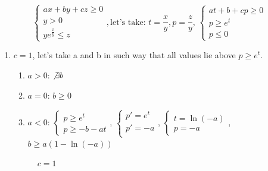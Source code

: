 \begin{equation*}
\begin{cases}
    a x + b y + c z \geq 0 \\
    y > 0 \\
    y e^{\frac{x}{y}} \leq z
\end{cases}, \text{let's take: $t = \frac{x}{y}, p = \frac{z}{y}$, }
\begin{cases}
    at + b + cp \geq 0 \\
    p \geq e^t \\
    p \leq 0
\end{cases}
\end{equation*}
\begin{enumerate}
    \item $c = 1$, let's take a and b in such way that all values lie above $p \geq e^t$.
    \begin{enumerate}
        \item $a > 0$: $\not \exists b$
        \item $a = 0$: $b \geq 0$
        \item $a < 0$: $\begin{cases}
            p \geq e^t \\
            p \geq - b - at
        \end{cases}$, $\begin{cases} 
        p' = e^t \\ 
        p' = -a  \\
        \end{cases}$, $\begin{cases}
            t = \ln(-a) \\
            p = -a 
        \end{cases}$, 
        $b \geq a(1-\ln(-a))$
    \end{enumerate}


\begin{figure}
  \centering
    \caption{$c = 1$}
\end{figure}


\end{enumerate}

